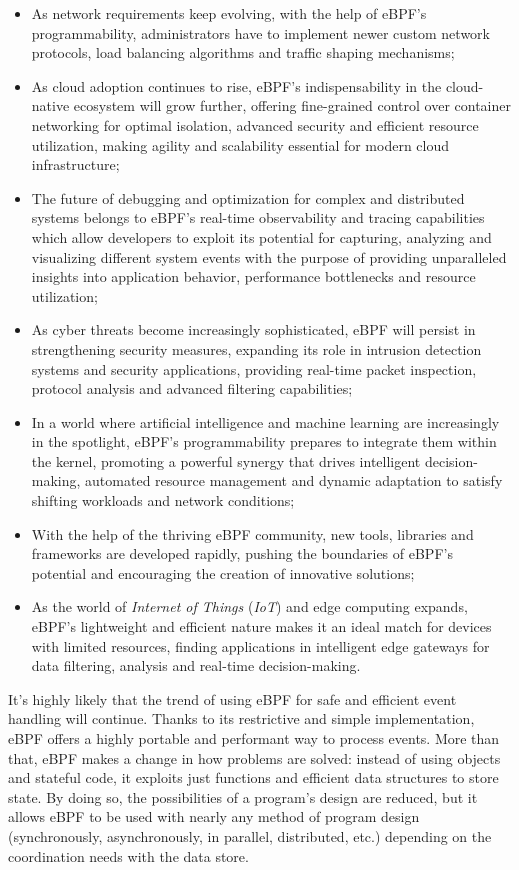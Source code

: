 \begin{itemize}
	\item 
		As network requirements keep evolving, with the help of eBPF's programmability, administrators have to implement newer custom network protocols, load balancing algorithms and traffic shaping mechanisms;
	\item 
		As cloud adoption continues to rise, eBPF's indispensability in the cloud-native ecosystem will grow further, offering fine-grained control over container networking for optimal isolation, advanced security and efficient resource utilization, making agility and scalability essential for modern cloud infrastructure;
	\item 
		The future of debugging and optimization for complex and distributed systems belongs to eBPF's real-time observability and tracing capabilities which allow developers to exploit its potential for capturing, analyzing and visualizing different system events with the purpose of providing unparalleled insights into application behavior, performance bottlenecks and resource utilization;
	\item 
		As cyber threats become increasingly sophisticated, eBPF will persist in strengthening security measures, expanding its role in intrusion detection systems and security applications, providing real-time packet inspection, protocol analysis and advanced filtering capabilities;
	\item 
		In a world where artificial intelligence and machine learning are increasingly in the spotlight, eBPF's programmability prepares to integrate them within the kernel, promoting a powerful synergy that drives intelligent decision-making, automated resource management and dynamic adaptation to satisfy shifting workloads and network conditions;
	\item 
		With the help of the thriving eBPF community, new tools, libraries and frameworks are developed rapidly, pushing the boundaries of eBPF's potential and encouraging the creation of innovative solutions;
	\item 
		As the world of \textit{Internet of Things} (\textit{IoT}) and edge computing expands, eBPF's lightweight and efficient nature makes it an ideal match for devices with limited resources, finding applications in intelligent edge gateways for data filtering, analysis and real-time decision-making.
\end{itemize}

It’s highly likely that the trend of using eBPF for safe and efficient event handling will continue.
Thanks to its restrictive and simple implementation, eBPF offers a highly portable and performant way to process events. 
More than that, eBPF makes a change in how problems are solved: instead of using objects and stateful code, it exploits just functions and efficient data structures to store state. 
By doing so, the possibilities of a program's design are reduced, but it allows eBPF to be used with nearly any method of program design (synchronously, asynchronously, in parallel, distributed, etc.) depending on the coordination needs with the data store.

